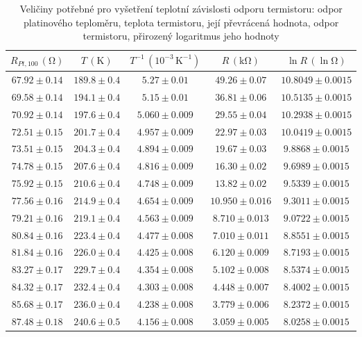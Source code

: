 \documentclass{../concepts/prepareprotokol} %
\begin{document}
\begin{table}[hbtp]
\centering
\caption{Veličiny potřebné pro vyšetření teplotní závislosti odporu termistoru: odpor platinového teploměru, teplota termistoru, její převrácená hodnota, odpor termistoru, přirozený logaritmus jeho hodnoty}
\begin{tabular}{ccccc}
 \toprule
 $R_{Pt,100}\, (\mathrm{\Omega})$ & $T\, (\mathrm{K})$ & $T^{-1}\, (10^{-3} \, \mathrm{K^{-1}})$ & $R\, (\mathrm{k\Omega})$ & $\ln R\, (\mathrm{\ln \Omega})$ \\
 \midrule
 $67.92 \pm 0.14$ & $189.8 \pm 0.4$ & $5.27 \pm 0.01$ & $49.26 \pm 0.07$ & $10.8049 \pm 0.0015$ \\
 $69.58 \pm 0.14$ & $194.1 \pm 0.4$ & $5.15 \pm 0.01$ & $36.81 \pm 0.06$ & $10.5135 \pm 0.0015$ \\
 $70.92 \pm 0.14$ & $197.6 \pm 0.4$ & $5.060 \pm 0.009$ & $29.55 \pm 0.04$ & $10.2938 \pm 0.0015$ \\
 $72.51 \pm 0.15$ & $201.7 \pm 0.4$ & $4.957 \pm 0.009$ & $22.97 \pm 0.03$ & $10.0419 \pm 0.0015$ \\
 $73.51 \pm 0.15$ & $204.3 \pm 0.4$ & $4.894 \pm 0.009$ & $19.67 \pm 0.03$ & $9.8868 \pm 0.0015$ \\
 $74.78 \pm 0.15$ & $207.6 \pm 0.4$ & $4.816 \pm 0.009$ & $16.30 \pm 0.02$ & $9.6989 \pm 0.0015$ \\
 $75.92 \pm 0.15$ & $210.6 \pm 0.4$ & $4.748 \pm 0.009$ & $13.82 \pm 0.02$ & $9.5339 \pm 0.0015$ \\
 $77.56 \pm 0.16$ & $214.9 \pm 0.4$ & $4.654 \pm 0.009$ & $10.950 \pm 0.016$ & $9.3011 \pm 0.0015$ \\
 $79.21 \pm 0.16$ & $219.1 \pm 0.4$ & $4.563 \pm 0.009$ & $8.710 \pm 0.013$ & $9.0722 \pm 0.0015$ \\
 $80.84 \pm 0.16$ & $223.4 \pm 0.4$ & $4.477 \pm 0.008$ & $7.010 \pm 0.011$ & $8.8551 \pm 0.0015$ \\
 $81.84 \pm 0.16$ & $226.0 \pm 0.4$ & $4.425 \pm 0.008$ & $6.120 \pm 0.009$ & $8.7193 \pm 0.0015$ \\
 $83.27 \pm 0.17$ & $229.7 \pm 0.4$ & $4.354 \pm 0.008$ & $5.102 \pm 0.008$ & $8.5374 \pm 0.0015$ \\
 $84.32 \pm 0.17$ & $232.4 \pm 0.4$ & $4.303 \pm 0.008$ & $4.448 \pm 0.007$ & $8.4002 \pm 0.0015$ \\
 $85.68 \pm 0.17$ & $236.0 \pm 0.4$ & $4.238 \pm 0.008$ & $3.779 \pm 0.006$ & $8.2372 \pm 0.0015$ \\
 $87.48 \pm 0.18$ & $240.6 \pm 0.5$ & $4.156 \pm 0.008$ & $3.059 \pm 0.005$ & $8.0258 \pm 0.0015$ \\

\end{tabular}
\end{table}
\end{document}
